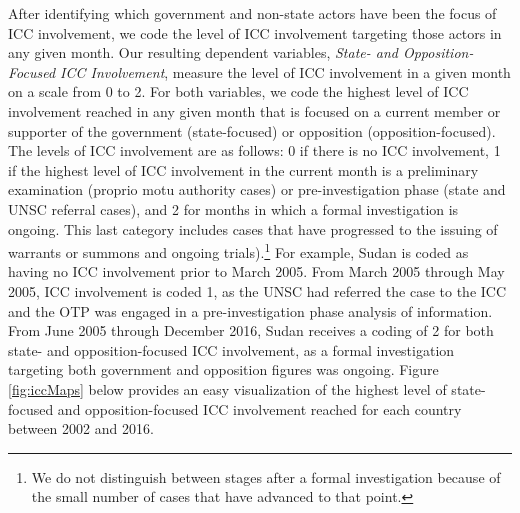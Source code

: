 After identifying which government and non-state actors have been the focus of ICC involvement, we code the level of ICC involvement targeting those actors in any given month. Our resulting dependent variables, \emph{State- and Opposition-Focused ICC Involvement}, measure the level of ICC involvement in a given month on a scale from 0 to 2. For both variables, we code the highest level of ICC involvement reached in any given month that is focused on a current member or supporter of the government (state-focused) or opposition (opposition-focused). The levels of ICC involvement are as follows: 0 if there is no ICC involvement, 1 if the highest level of ICC involvement in the current month is a preliminary examination (proprio motu authority cases) or pre-investigation phase (state and UNSC referral cases), and 2 for months in which a formal investigation is ongoing. This last category includes cases that have progressed to the issuing of warrants or summons and ongoing trials).\footnote{We do not distinguish between stages after a formal investigation because of the small number of cases that have advanced to that point.} For example, Sudan is coded as having no ICC involvement prior to March 2005. From March 2005 through May 2005, ICC involvement is coded 1, as the UNSC had referred the case to the ICC and the OTP was engaged in a pre-investigation phase analysis of information. From June 2005 through December 2016, Sudan receives a coding of 2 for both state- and opposition-focused ICC involvement, as a formal investigation targeting both government and opposition figures was ongoing. Figure \ref{fig:iccMaps} below provides an easy visualization of the highest level of state-focused and opposition-focused ICC involvement reached for each country between 2002 and 2016.

